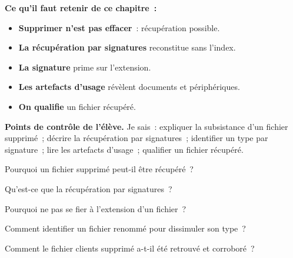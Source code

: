 \separateur

\begin{boxresume}
\textbf{Ce qu'il faut retenir de ce chapitre~:}
\begin{itemize}
    \item \textbf{Supprimer n'est pas effacer}~: récupération possible.
    \item \textbf{La récupération par signatures} reconstitue sans l'index.
    \item \textbf{La signature} prime sur l'extension.
    \item \textbf{Les artefacts d'usage} révèlent documents et périphériques.
    \item \textbf{On qualifie} un fichier récupéré.
\end{itemize}
\end{boxresume}

\begin{boxinfo}
\textbf{Points de contrôle de l'élève.} Je sais~: expliquer la subsistance
d'un fichier supprimé~; décrire la récupération par signatures~; identifier un
type par signature~; lire les artefacts d'usage~; qualifier un fichier
récupéré.
\end{boxinfo}

\bigskip

\begin{boxexo}[title={\ding{45}\quad Exercice~11.1. Subsister \niveaubase}]
Pourquoi un fichier supprimé peut-il être récupéré~?
\end{boxexo}

\begin{boxexo}[title={\ding{45}\quad Exercice~11.2. Carving \niveaubase}]
Qu'est-ce que la récupération par signatures~?
\end{boxexo}

\begin{boxexo}[title={\ding{45}\quad Exercice~11.3. Extension \niveaubase}]
Pourquoi ne pas se fier à l'extension d'un fichier~?
\end{boxexo}

\begin{boxexo}[title={\ding{45}\quad Exercice~11.4. Signature \niveaumoyen}]
Comment identifier un fichier renommé pour dissimuler son type~?
\end{boxexo}

\begin{boxexo}[title={\ding{45}\quad Exercice~11.5. TSANAGA \niveaumoyen}]
Comment le fichier clients supprimé a-t-il été retrouvé et corroboré~?
\end{boxexo}

